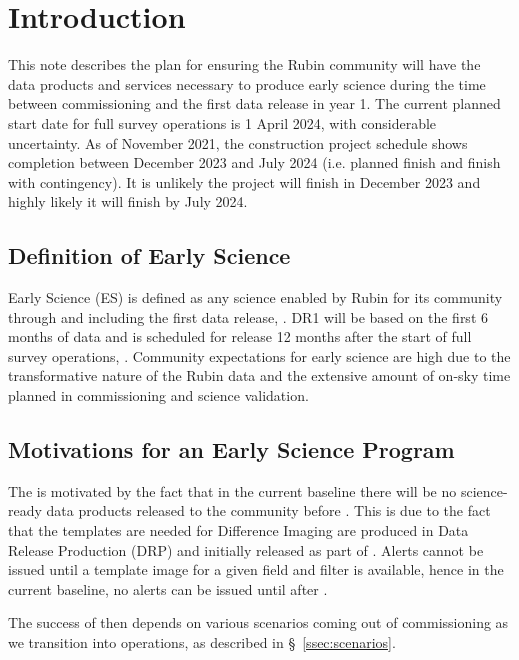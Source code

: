 \section{Introduction}

This  note describes the plan for ensuring the Rubin community will have the data products and services necessary to produce early science during the time between commissioning and the first data release in year 1. 
The current planned start date for full survey operations is 1 April 2024, with considerable uncertainty. 
As of November 2021, the construction project schedule shows completion between December 2023 and July 2024 (i.e. planned finish and finish with contingency). 
It is unlikely the project will finish in December 2023 and highly likely it will finish by July 2024. 

\subsection{Definition of Early Science}  \label{ssec:defn}

Early Science (ES) is defined as any science enabled by Rubin for its community through and including the first data release, \drone.
DR1 will be based on the first 6 months of data and is scheduled for release 12 months  after the start of full survey operations, \citep{RDO-011}.
Community expectations for early science are high due to the transformative nature of the Rubin data and the extensive amount of on-sky time planned in commissioning and science validation.

\subsection{Motivations for an Early Science Program}

The \esp is motivated by the fact that in the current baseline there will be no science-ready data products released to the community before \drone.
This is due to the fact that the templates are needed for Difference Imaging are produced in Data Release Production (DRP) and initially released as part of \drone. 
Alerts cannot be issued until a template image for a given field and filter is available, hence  in the current baseline, no alerts can be issued until after \drone.

The success of \es then depends on various scenarios coming out of commissioning as we transition into operations, as described in \S~\ref{ssec:scenarios}. 

